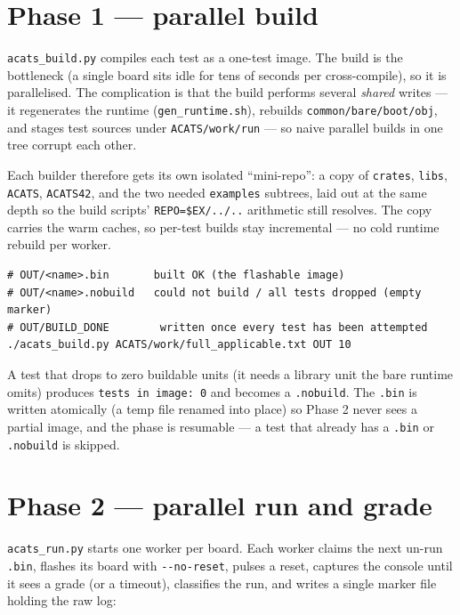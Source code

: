 \section{Phase 1 --- parallel build}

\texttt{acats\_build.py} compiles each test as a one-test image. The build is the
bottleneck (a single board sits idle for tens of seconds per cross-compile), so it is
parallelised. The complication is that the build performs several \emph{shared} writes
--- it regenerates the runtime (\texttt{gen\_runtime.sh}), rebuilds
\texttt{common/bare/boot/obj}, and stages test sources under \texttt{ACATS/work/run}
--- so naive parallel builds in one tree corrupt each other.

Each builder therefore gets its own isolated ``mini-repo'': a copy of
\texttt{crates}, \texttt{libs}, \texttt{ACATS}, \texttt{ACATS42}, and the two needed
\texttt{examples} subtrees, laid out at the same depth so the build scripts'
\texttt{REPO=\$EX/../..} arithmetic still resolves. The copy carries the warm caches,
so per-test builds stay incremental --- no cold runtime rebuild per worker.

\begin{lstlisting}[style=sh]
# OUT/<name>.bin       built OK (the flashable image)
# OUT/<name>.nobuild   could not build / all tests dropped (empty marker)
# OUT/BUILD_DONE        written once every test has been attempted
./acats_build.py ACATS/work/full_applicable.txt OUT 10
\end{lstlisting}

A test that drops to zero buildable units (it needs a library unit the bare runtime
omits) produces \texttt{tests in image: 0} and becomes a \texttt{.nobuild}. The
\texttt{.bin} is written atomically (a temp file renamed into place) so Phase 2 never
sees a partial image, and the phase is resumable --- a test that already has a
\texttt{.bin} or \texttt{.nobuild} is skipped.

\section{Phase 2 --- parallel run and grade}

\texttt{acats\_run.py} starts one worker per board. Each worker claims the next
un-run \texttt{.bin}, flashes its board with \texttt{-{}-no-reset}, pulses a reset,
captures the console until it sees a grade (or a timeout), classifies the run, and
writes a single marker file holding the raw log:

